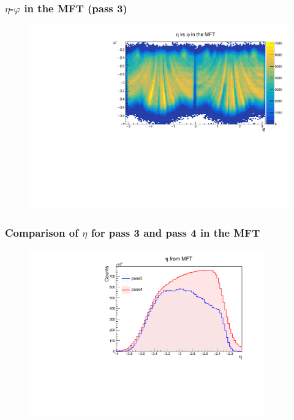\documentclass[10pt]{beamer}
\begin{document}
\begin{frame}
    \frametitle{$\eta$-$\varphi$ in the MFT (pass 3)}
        \begin{figure}
            \begin{center}
                \includegraphics[width=\textwidth]{Plots/pass3_MFT/eta_phi_pass3.pdf}
            \end{center}
        \end{figure}
\end{frame}

\begin{frame}
    \frametitle{Comparison of $\eta$ for pass 3 and pass 4 in the MFT}
        \begin{figure}
            \begin{center}
                \includegraphics[width=0.9\textwidth]{Plots/pass3_pass4.pdf}
            \end{center}
        \end{figure}
\end{frame}
\end{document}
